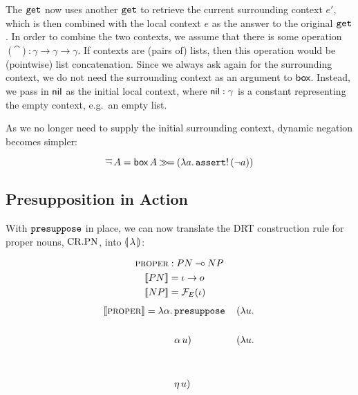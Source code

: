 The $\mathtt{get}$ now uses another $\mathtt{get}$ to retrieve the current
surrounding context $e'$, which is then combined with the local context $e$
as the answer to the original $\mathtt{get}$. In order to combine the two
contexts, we assume that there is some operation
$(\cat) : \gamma \to \gamma \to \gamma$. If contexts are (pairs of) lists,
then this operation would be (pointwise) list concatenation. Since we
always ask again for the surrounding context, we do not need the
surrounding context as an argument to $\textsf{box}$. Instead, we pass in $\textsf{nil}$ as
the initial local context, where $\textsf{nil} : \gamma$ is a constant representing
the empty context, e.g.\ an empty list.

As we no longer need to supply the initial surrounding context, dynamic
negation becomes simpler:

$$
\mathop{\overline{\lnot}} A = \textsf{box}\,A \mathbin{\gg\!=} (\lambda a.\, \mathtt{assert}!\,(\lnot a))
$$


\subsection{Presupposition in Action}
\label{ssec:presupposition-in-action}

With $\mathtt{presuppose}$ in place, we can now translate the DRT construction
rule for proper nouns, $\mathrm{CR.PN}$, into $\llparenthesis \, \lambda \, \rrparenthesis$:

\vspace{6mm}

\hspace{-1cm}
\begin{minipage}{0.69\textwidth}
\crpnbox
\end{minipage}
\begin{minipage}{0.31\textwidth}
\vspace{-4mm}
\begin{align*}
\textsc{proper} &: PN \mathbin{{-}\mkern-3.5mu{\circ}} NP \\
\llbracket PN \rrbracket &= \iota \to o \\
\llbracket NP \rrbracket &= \mathcal{F}_E(\iota)
\end{align*}
\vspace{2mm}
\begin{align*}
  \llbracket \textsc{proper} \rrbracket =
  \lambda \alpha.\, &\mathtt{presuppose}\,&(\lambda u.\,  \\
               \\
               &\alpha\,u)\,&(\lambda u.\,  \\
               \\ \\
               & \eta\,u)
\end{align*}
\end{minipage}

